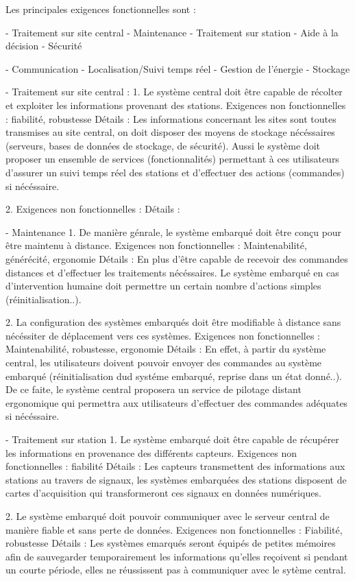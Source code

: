 Les principales exigences fonctionnelles sont :

- Traitement sur site central
- Maintenance
- Traitement sur station
- Aide à la décision
- Sécurité

- Communication
- Localisation/Suivi temps réel
- Gestion de l'énergie
- Stockage



- Traitement sur site central : 
1. Le système central doit être capable de récolter et exploiter les informations provenant des stations.
Exigences non fonctionnelles : fiabilité, robustesse
Détails : Les informations concernant les sites sont toutes transmises au site central, on doit disposer des moyens
de stockage nécéssaires (serveurs, bases de données de stockage, de sécurité). Aussi le système doit proposer un
ensemble de services (fonctionnalités) permettant à ces utilisateurs d'assurer un suivi temps réel des stations et
d'effectuer des actions (commandes) si nécéssaire.

2. 
Exigences non fonctionnelles : 
Détails : 


- Maintenance
1. De manière génrale, le système embarqué doit être conçu pour être maintenu à distance.
Exigences non fonctionnelles : Maintenabilité, générécité, ergonomie
Détails : En plus d'être capable de recevoir des commandes distances et d'effectuer les traitements nécéssaires.
Le système embarqué en cas d'intervention humaine doit permettre un certain nombre d'actions 
simples (réinitialisation..).

2. La configuration des systèmes embarqués doit être modifiable à distance sans nécéssiter de déplacement vers 
ces systèmes.
Exigences non fonctionnelles : Maintenabilité, robustesse, ergonomie
Détails : En effet, à partir du système central, les utilisateurs doivent pouvoir envoyer des commandes au système
embarqué (réinitialisation dud systéme embarqué, reprise dans un état donné..). De ce faite, le système central 
proposera un service de pilotage distant ergonomique qui permettra aux utilisateurs d'effectuer des commandes 
adéquates si nécéssaire.


- Traitement sur station
1. Le système embarqué doit être capable de récupérer les informations en provenance des différents capteurs.
Exigences non fonctionnelles : fiabilité
Détails : Les capteurs transmettent des informations aux stations au travers de signaux, les systèmes embarquées des
stations disposent de cartes d'acquisition qui transformeront ces signaux en données numériques. 

2. Le système embarqué doit pouvoir communiquer avec le serveur central de manière fiable et sans perte de données.
Exigences non fonctionnelles : Fiabilité, robustesse
Détails : Les systèmes emarqués seront équipés de petites mémoires afin de sauvegarder temporairement les informations
qu'elles reçoivent si pendant un courte période, elles ne réussissent pas à communiquer avec le sytème central.


